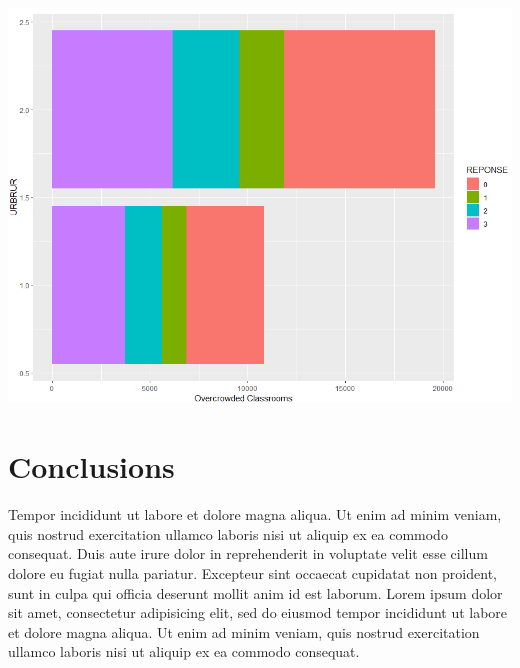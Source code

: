 \documentclass[a0, portrait]{a0poster}
\begin{document}
\begin{multicols}{3}
\begin{center}\vspace{1cm}
\includegraphics[width=0.8\linewidth]{fig_classrooms_urbrur.png}
\end{center}\vspace{1cm}


\color{SaddleBrown} %

\section*{Conclusions}

Tempor incididunt ut labore et dolore magna aliqua. Ut enim ad minim veniam,
quis nostrud exercitation ullamco laboris nisi ut aliquip ex ea commodo
consequat. Duis aute irure dolor in reprehenderit in voluptate velit esse
cillum dolore eu fugiat nulla pariatur. Excepteur sint occaecat cupidatat non
proident, sunt in culpa qui officia deserunt mollit anim id est laborum. Lorem ipsum dolor sit amet, consectetur adipisicing elit, sed do eiusmod
tempor incididunt ut labore et dolore magna aliqua. Ut enim ad minim veniam,
quis nostrud exercitation ullamco laboris nisi ut aliquip ex ea commodo
consequat.

\color{Black} %



\end{multicols}
\end{document}
